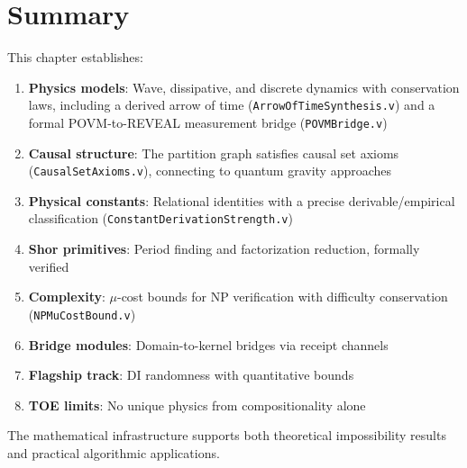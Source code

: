 \section{Summary}


This chapter establishes:
\begin{enumerate}
    \item \textbf{Physics models}: Wave, dissipative, and discrete dynamics with conservation laws, including a derived arrow of time (\texttt{ArrowOfTimeSynthesis.v}) and a formal POVM-to-REVEAL measurement bridge (\texttt{POVMBridge.v})
    \item \textbf{Causal structure}: The partition graph satisfies causal set axioms (\texttt{CausalSetAxioms.v}), connecting to quantum gravity approaches
    \item \textbf{Physical constants}: Relational identities with a precise derivable/empirical classification (\texttt{ConstantDerivationStrength.v})
    \item \textbf{Shor primitives}: Period finding and factorization reduction, formally verified
    \item \textbf{Complexity}: $\mu$-cost bounds for NP verification with difficulty conservation (\texttt{NPMuCostBound.v})
    \item \textbf{Bridge modules}: Domain-to-kernel bridges via receipt channels
    \item \textbf{Flagship track}: DI randomness with quantitative bounds
    \item \textbf{TOE limits}: No unique physics from compositionality alone
\end{enumerate}

The mathematical infrastructure supports both theoretical impossibility results and practical algorithmic applications.
